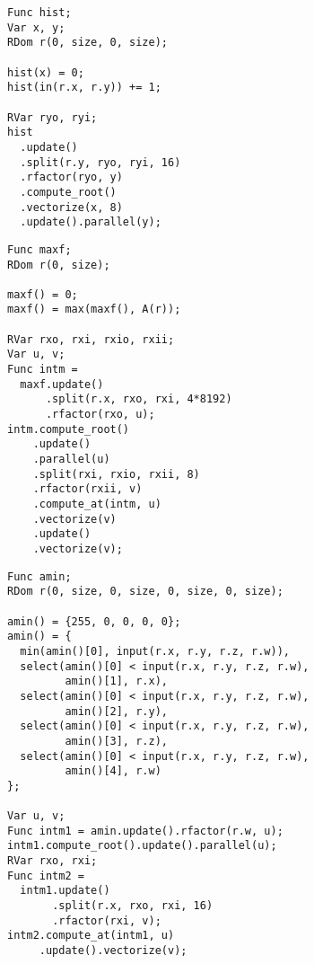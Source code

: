 
\begin{minipage}{\linewidth}
\begin{lstlisting}[caption={Histogram of a two-dimensional image.}, label={lst:benchmark_histogram}]
Func hist;
Var x, y;
RDom r(0, size, 0, size);

hist(x) = 0;
hist(in(r.x, r.y)) += 1;

RVar ryo, ryi;
hist
  .update()
  .split(r.y, ryo, ryi, 16)
  .rfactor(ryo, y)
  .compute_root()
  .vectorize(x, 8)
  .update().parallel(y);
\end{lstlisting}
\end{minipage}

\begin{minipage}{\linewidth}
\begin{lstlisting}[caption={Maximum value over a 1D array}, label={lst:benchmark_max}]
Func maxf;
RDom r(0, size);

maxf() = 0;
maxf() = max(maxf(), A(r));

RVar rxo, rxi, rxio, rxii;
Var u, v;
Func intm =
  maxf.update()
      .split(r.x, rxo, rxi, 4*8192)
      .rfactor(rxo, u);
intm.compute_root()
    .update()
    .parallel(u)
    .split(rxi, rxio, rxii, 8)
    .rfactor(rxii, v)
    .compute_at(intm, u)
    .vectorize(v)
    .update()
    .vectorize(v);
\end{lstlisting}
\end{minipage}

\begin{minipage}{\linewidth}
\begin{lstlisting}[caption={Argmin over 4D array}, label={lst:benchmark_argmin}]
Func amin;
RDom r(0, size, 0, size, 0, size, 0, size);

amin() = {255, 0, 0, 0, 0};
amin() = {
  min(amin()[0], input(r.x, r.y, r.z, r.w)),
  select(amin()[0] < input(r.x, r.y, r.z, r.w),
         amin()[1], r.x),
  select(amin()[0] < input(r.x, r.y, r.z, r.w),
         amin()[2], r.y),
  select(amin()[0] < input(r.x, r.y, r.z, r.w),
         amin()[3], r.z),
  select(amin()[0] < input(r.x, r.y, r.z, r.w),
         amin()[4], r.w)
};

Var u, v;
Func intm1 = amin.update().rfactor(r.w, u);
intm1.compute_root().update().parallel(u);
RVar rxo, rxi;
Func intm2 =
  intm1.update()
       .split(r.x, rxo, rxi, 16)
       .rfactor(rxi, v);
intm2.compute_at(intm1, u)
     .update().vectorize(v);
\end{lstlisting}
\end{minipage}

